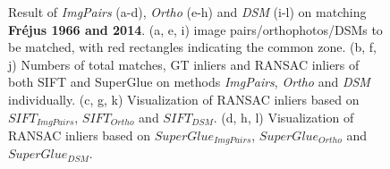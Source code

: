 \begin{figure}[htbp]
\begin{center}
{\begin{minipage}[t]{0.48\linewidth}
            \end{minipage}%
        }
        \caption{{\scriptsize Result of \textit{ImgPairs} (a-d), \textit{Ortho} (e-h) and \textit{DSM} (i-l) on matching \textbf{Fr{\'e}jus 1966 and 2014}. (a, e, i) image pairs/orthophotos/DSMs to be matched, with red rectangles indicating the common zone. (b, f, j) Numbers of total matches, GT inliers and RANSAC inliers of both SIFT and SuperGlue on methods \textit{ImgPairs}, \textit{Ortho} and \textit{DSM} individually. (c, g, k) Visualization of RANSAC inliers based on $SIFT_{ImgPairs}$, $SIFT_{Ortho}$ and $SIFT_{DSM}$. (d, h, l) Visualization of RANSAC inliers based on $SuperGlue_{ImgPairs}$, $SuperGlue_{Ortho}$ and $SuperGlue_{DSM}$.}}
        \label{MatchVizFrejus1966DSM}
    \end{center}
\end{figure} 



